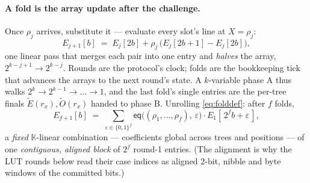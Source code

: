 \documentclass[11pt]{article}
\newcommand{\K}{\mathbb{K}}            %
\newcommand{\bits}{\{0,1\}}
\newcommand{\mle}[1]{\widetilde{#1}}
\newcommand{\eq}{\mathsf{eq}}
\theoremstyle{definition}
\begin{document}
\paragraph{A fold is the array update after the challenge.}
Once $\rho_j$ arrives, substitute it --- evaluate every slot's line at
$X = \rho_j$:
\begin{equation}\label{eq:folddef}
  E_{j+1}[b] \;=\; E_j[2b] + \rho_j\,\big(E_j[2b{+}1] - E_j[2b]\big),
\end{equation}
one linear pass that merges each pair into one entry and \emph{halves}
the array, $2^{k-j+1} \to 2^{k-j}$.  Rounds are the protocol's clock;
folds are the bookkeeping tick that advances the arrays to the next
round's state.  A $k$-variable phase A thus walks
$2^k \to 2^{k-1} \to \dots \to 1$, and the last fold's single entries
are the per-tree finals $\mle{E}(r_x), \mle{O}(r_x)$ handed to phase B.
Unrolling \eqref{eq:folddef}: after $f$ folds,
\[
  E_{f+1}[b] \;=\; \sum_{\varepsilon \in \bits^{f}}
    \eq\big((\rho_1, \dots, \rho_f),\, \varepsilon\big)\cdot
    E_1[\,2^f b + \varepsilon\,],
\]
a \emph{fixed} $\K$-linear combination --- coefficients global across
trees and positions --- of one \emph{contiguous, aligned block} of $2^f$
round-1 entries.  (The alignment is why the LUT rounds below read their
case indices as aligned 2-bit, nibble and byte windows of the committed
bits.)
\end{document}
